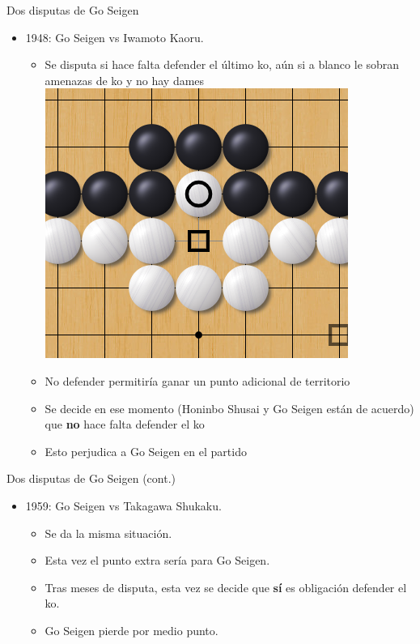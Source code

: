 \documentclass{beamer}
\begin{document}
\begin{frame}{Dos disputas de Go Seigen}
  \begin{itemize}
    \item 1948: Go Seigen vs Iwamoto Kaoru.
    \begin{itemize}
    \item Se disputa si hace falta defender el último ko, aún si a blanco le sobran amenazas de ko y no hay dames
    \includegraphics[scale=0.2]{ultiko.png}
    \item No defender permitiría ganar un punto adicional de territorio
    \item Se decide en ese momento (Honinbo Shusai y Go Seigen están de acuerdo) que \textbf{no} hace falta defender el ko
    \item Esto perjudica a Go Seigen en el partido
    \end{itemize}
  \end{itemize}

\end{frame}

\begin{frame}{Dos disputas de Go Seigen (cont.)}
  \begin{itemize}
    \item 1959: Go Seigen vs Takagawa Shukaku.
    \begin{itemize}
    \item Se da la misma situación.
    \item Esta vez el punto extra sería para Go Seigen.
    \item Tras meses de disputa, esta vez se decide que \textbf{sí} es obligación defender el ko.
    \item Go Seigen pierde por medio punto.
    \end{itemize}
  \end{itemize}

\end{frame}
\end{document}
